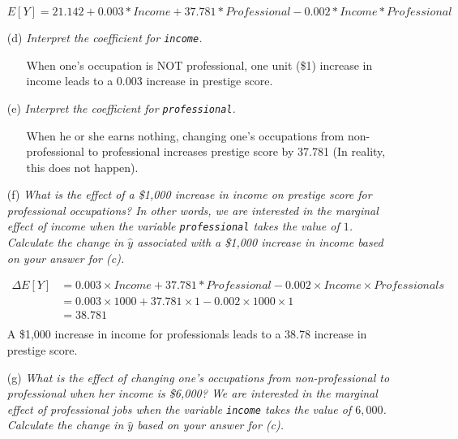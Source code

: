 \documentclass[12pt,letterpaper]{article}
\begin{document}
\begin{enumerate}
		$$E[Y]= 21.142 + 0.003*Income + 37.781*Professional - 0.002*Income* Professional$$
						\vspace{.25cm}
		\item [(d)]
		\textit{Interpret the coefficient for \texttt{income}.}
		\vspace{.5cm}
\begin{itemize}
	\item [] 		When one's occupation is NOT professional, one unit (\$1) increase in income leads to a 0.003 increase in prestige score. 
			\end{itemize}
		 		\vspace{1cm}
		\item [(e)] \textit{Interpret the coefficient for \texttt{professional}.}
				 		\vspace{.5cm}
		\begin{itemize}
			\item [] When he or she earns nothing, changing one's occupations from non-professional to professional increases prestige score by 37.781 (In reality, this does not happen).
		\end{itemize}
		 		\vspace{1cm}
		\item [(f)]
		\textit{What is the effect of a \$1,000 increase in income on prestige score for professional occupations? In other words, we are interested in the marginal effect of income when the variable \texttt{professional} takes the value of $1$. Calculate the change in $\hat{y}$ associated with a \$1,000 increase in income based on your answer for (c).}
		
		
		\begin{align*}
		\Delta E[Y] &= 0.003 \times Income + 37.781*Professional - 0.002 \times Income \times Professionals \\
		&= 0.003 \times 1000 + 37.781 \times 1 - 0.002 \times 1000 \times 1 \\
		&= 38.781\\
		\end{align*}		 		\vspace{.25cm}
		A \$1,000 increase in income for professionals leads to a 38.78 increase in prestige score. 
		
\newpage
		\item [(g)]
		\textit{What is the effect of changing one's occupations from non-professional to professional when her income is \$6,000? We are interested in the marginal effect of professional jobs when the variable \texttt{income} takes the value of $6,000$. Calculate the change in $\hat{y}$ based on your answer for (c).}
		

\end{enumerate}
\end{document}
